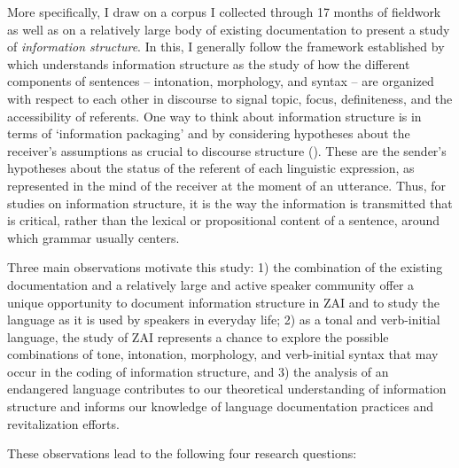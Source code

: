 More specifically, I draw on a corpus I collected through 17 months of fieldwork as well as on a relatively large body of existing documentation to present a study of \textit{information structure}. In this, I generally follow the framework established by \citet{lambrecht1994} which understands information structure as the study of how the different components of sentences -- intonation, morphology, and syntax -- are organized with respect to each other in discourse to signal topic, focus, definiteness, and the accessibility of referents. One way to think about information structure is in terms of `information packaging' and by considering hypotheses about the receiver's assumptions as crucial to discourse structure (\citealt{chafe1994,lambrecht1994}). These are the sender's hypotheses about the status of the referent of each linguistic expression, as represented in the mind of the receiver at the moment of an utterance. Thus, for studies on information structure, it is the way the information is transmitted that is critical, rather than the lexical or propositional content of a sentence, around which grammar usually centers.

Three main observations motivate this study: 1) the combination of the existing documentation and a relatively large and active speaker community offer a unique opportunity to document information structure in ZAI and to study the language as it is used by speakers in everyday life; 2) as a tonal and verb-initial language, the study of ZAI represents a chance to explore the possible combinations of tone, intonation, morphology, and verb-initial syntax that may occur in the coding of information structure, and 3) the analysis of an endangered language contributes to our theoretical understanding of information structure and informs our knowledge of language documentation practices and revitalization efforts. 

These observations lead to the following four research questions: 

